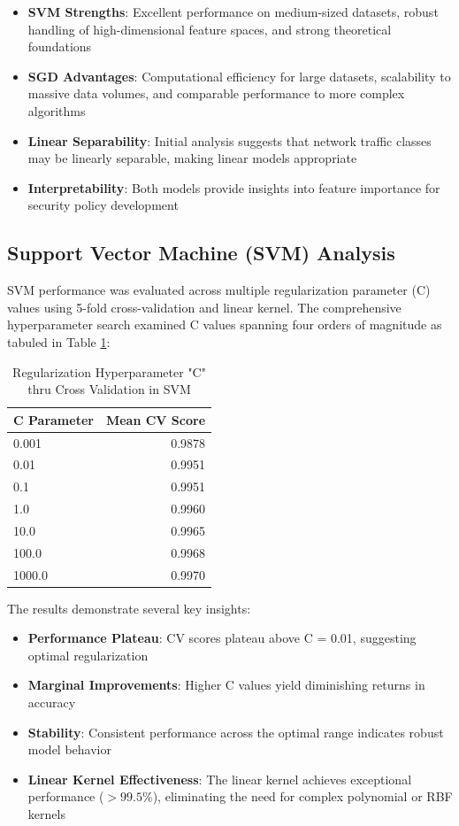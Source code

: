\documentclass[12pt,a4paper]{article}
\begin{document}
\begin{itemize}
    \item \textbf{SVM Strengths}: Excellent performance on medium-sized datasets, robust handling of high-dimensional feature spaces, and strong theoretical foundations
    \item \textbf{SGD Advantages}: Computational efficiency for large datasets, scalability to massive data volumes, and comparable performance to more complex algorithms
    \item \textbf{Linear Separability}: Initial analysis suggests that network traffic classes may be linearly separable, making linear models appropriate
    \item \textbf{Interpretability}: Both models provide insights into feature importance for security policy development
\end{itemize}

\subsection{Support Vector Machine (SVM) Analysis}

SVM performance was evaluated across multiple regularization parameter (C) values using 5-fold cross-validation and linear kernel. The comprehensive hyperparameter search examined C values spanning four orders of magnitude as tabuled in Table \ref{tab:SVMHyper}:

\begin{table}[H]
    \centering
    \caption{Regularization Hyperparameter "C" thru Cross Validation in SVM}
    \begin{tabular}{|l|r|}
    \hline
    \textbf{C Parameter} & \textbf{Mean CV Score} \\
    \hline
    0.001 & 0.9878 \\
    \hline
    0.01 & 0.9951 \\
    \hline
    0.1 & 0.9951 \\
    \hline
    1.0 & 0.9960 \\
    \hline
    10.0 & 0.9965 \\
    \hline
    100.0 & 0.9968 \\
    \hline
    1000.0 & 0.9970 \\
    \hline
    \end{tabular}
    \label{tab:SVMHyper}
\end{table}

The results demonstrate several key insights:

\begin{itemize}
    \item \textbf{Performance Plateau}: CV scores plateau above C = 0.01, suggesting optimal regularization
    \item \textbf{Marginal Improvements}: Higher C values yield diminishing returns in accuracy
    \item \textbf{Stability}: Consistent performance across the optimal range indicates robust model behavior
    \item \textbf{Linear Kernel Effectiveness}: The linear kernel achieves exceptional performance ($>99.5\%$), eliminating the need for complex polynomial or RBF kernels
\end{itemize}
\end{document}
